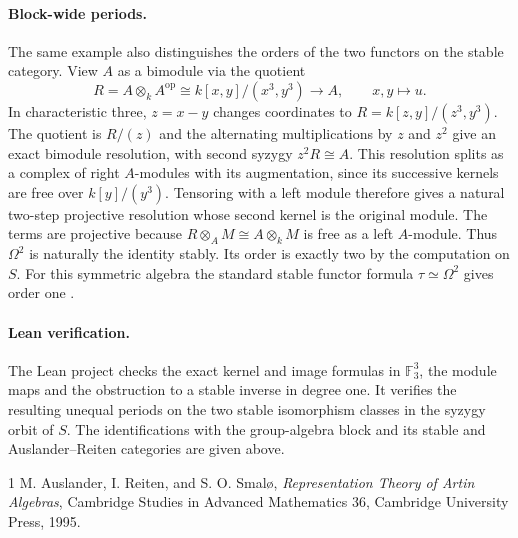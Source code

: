 \documentclass[11pt]{article}
\begin{document}
\paragraph{Block-wide periods.}
The same example also distinguishes the orders of the two functors on
the stable category. View \(A\) as a bimodule via the quotient
\[
  R=A\otimes_k A^{\mathrm{op}}\cong k[x,y]/(x^3,y^3)
        \longrightarrow A,\qquad x,y\longmapsto u .
\]
In characteristic three, \(z=x-y\) changes coordinates to
\(R=k[z,y]/(z^3,y^3)\). The quotient is \(R/(z)\) and the alternating
multiplications by \(z\) and \(z^2\) give an exact bimodule resolution,
with second syzygy \(z^2R\cong A\). This resolution splits as a complex
of right \(A\)-modules with its augmentation, since its successive
kernels are free over \(k[y]/(y^3)\). Tensoring with a left module
therefore gives a natural two-step projective resolution whose second
kernel is the original module. The terms are projective because
\(R\otimes_A M\cong A\otimes_k M\) is free as a left \(A\)-module. Thus
\(\Omega^2\) is naturally the identity stably. Its order is exactly two
by the computation on \(S\). For this symmetric algebra the standard
stable functor formula \(\tau\simeq\Omega^2\) gives order one
\cite[Corollary IV.8.6]{ARS}.

\paragraph{Lean verification.}
The Lean project checks the exact kernel and image formulas in
\(\mathbb F_3^3\), the module maps and the obstruction to a stable
inverse in degree one. It verifies the resulting unequal periods on
the two stable isomorphism classes in the syzygy orbit of \(S\).
The identifications with the group-algebra block and its stable and
Auslander--Reiten categories are given above.

\begin{thebibliography}{1}
M. Auslander, I. Reiten, and S. O. Smal{\o},
\emph{Representation Theory of Artin Algebras},
Cambridge Studies in Advanced Mathematics 36, Cambridge University Press, 1995.
\end{thebibliography}
\end{document}
